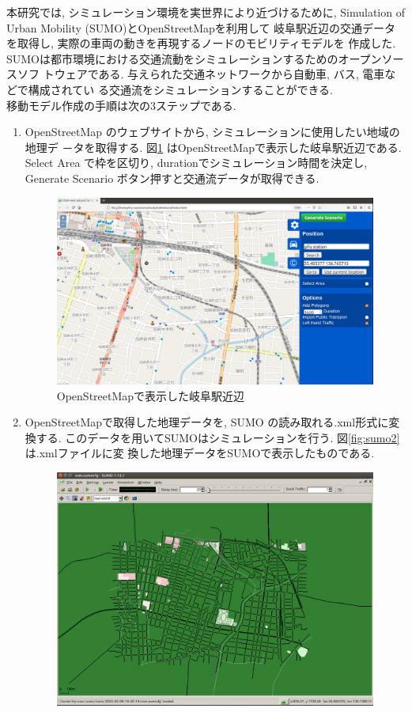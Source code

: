 \indent 本研究では, シミュレーション環境を実世界により近づけるために, 
Simulation of Urban Mobility (SUMO)\cite{sumo}とOpenStreetMap\cite{openstreetmap}を利用して
岐阜駅近辺の交通データを取得し, 実際の車両の動きを再現するノードのモビリティモデルを
作成した. SUMOは都市環境における交通流動をシミュレーションするためのオープンソースソフ
トウェアである. 与えられた交通ネットワークから自動車, バス, 電車などで構成されてい
る交通流をシミュレーションすることができる. \\
\indent 移動モデル作成の手順は次の3ステップである. 
\begin{enumerate}
  \item OpenStreetMap のウェブサイトから, シミュレーションに使用したい地域の地理デ
  －タを取得する. 図\ref{fig:sumo1} はOpenStreetMapで表示した岐阜駅近辺である. Select
  Area で枠を区切り, durationでシミュレーション時間を決定し, Generate Scenario
  ボタン押すと交通流データが取得できる.\\
  \begin{figure}[h]
    \centering
    \includegraphics[scale=0.3]{figures/SUMO1.png}
    \caption{OpenStreetMapで表示した岐阜駅近辺}
    \label{fig:sumo1}
  \end{figure}
  \item OpenStreetMapで取得した地理データを, SUMO の読み取れる.xml形式に変換する. 
  このデータを用いてSUMOはシミュレーションを行う. 図\ref{fig:sumo2}は.xmlファイルに変
  換した地理データをSUMOで表示したものである. \\
  \begin{figure}[h]
    \centering
    \includegraphics[scale=0.3]{figures/SUMO2.png}

\end{figure}
\end{enumerate}
